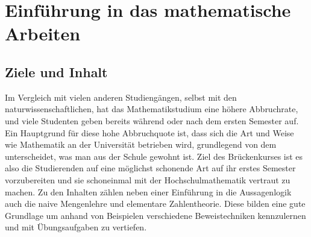 \chapter{Einführung in das mathematische Arbeiten}
\section{Ziele und Inhalt}
Im Vergleich mit vielen anderen Studiengängen, selbst mit den naturwissenschaftlichen,
hat das Mathematikstudium eine höhere Abbruchrate, und viele Studenten geben bereits während
oder nach dem ersten Semester auf. Ein Hauptgrund für diese hohe Abbruchquote ist, dass
sich die Art und Weise wie Mathematik an der Universität betrieben wird, grundlegend von dem
unterscheidet, was man aus der Schule gewohnt ist. Ziel des Brückenkurses ist es also die
Studierenden auf eine möglichst schonende Art auf ihr erstes Semester vorzubereiten und sie schoneinmal
mit der Hochschulmathematik vertraut zu machen. Zu den Inhalten zählen neben einer Einführung
in die Aussagenlogik auch die naive Mengenlehre und elementare Zahlentheorie. Diese bilden
eine gute Grundlage um anhand von Beispielen verschiedene Beweistechniken kennzulernen und
mit Übungsaufgaben zu vertiefen.

